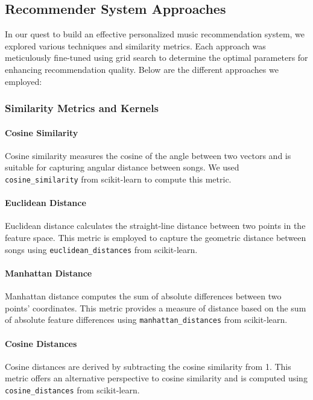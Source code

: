 \documentclass[a4paper, 24pt]{article}
\begin{document}
\subsection{Recommender System Approaches}

In our quest to build an effective personalized music recommendation system, we explored various techniques and similarity metrics. Each approach was meticulously fine-tuned using grid search to determine the optimal parameters for enhancing recommendation quality. Below are the different approaches we employed:

\subsubsection{Similarity Metrics and Kernels}

\paragraph{Cosine Similarity}
Cosine similarity measures the cosine of the angle between two vectors and is suitable for capturing angular distance between songs. We used \texttt{cosine\_similarity} from scikit-learn to compute this metric.

\paragraph{Euclidean Distance}
Euclidean distance calculates the straight-line distance between two points in the feature space. This metric is employed to capture the geometric distance between songs using \texttt{euclidean\_distances} from scikit-learn.

\paragraph{Manhattan Distance}
Manhattan distance computes the sum of absolute differences between two points' coordinates. This metric provides a measure of distance based on the sum of absolute feature differences using \texttt{manhattan\_distances} from scikit-learn.

\paragraph{Cosine Distances}
Cosine distances are derived by subtracting the cosine similarity from 1. This metric offers an alternative perspective to cosine similarity and is computed using \texttt{cosine\_distances} from scikit-learn.
\end{document}
